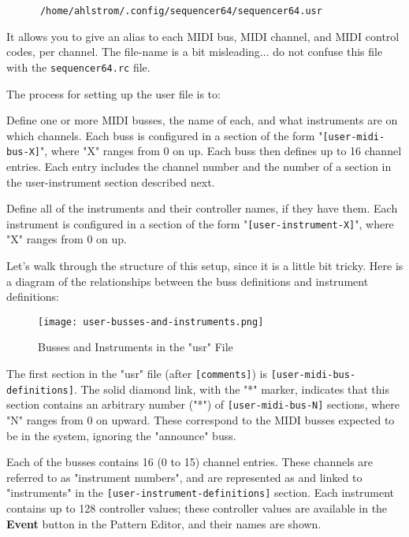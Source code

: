    \begin{verbatim}
      /home/ahlstrom/.config/sequencer64/sequencer64.usr
   \end{verbatim}

   It allows you to give an alias to 
   each MIDI bus, MIDI channel, and MIDI control 
   codes, per channel.
   The file-name is a bit misleading... do not confuse this file with the
   \texttt{sequencer64.rc} file.

   The process for setting up the user file is to:

   \begin{enumber}
      \item Define one or more MIDI busses, the name of each, and what
         instruments are on which channels.  Each buss is configured in a
         section of the form "\texttt{[user-midi-bus-X]}", where "X" ranges
         from 0 on up.  Each buss then defines up to 16 channel entries.
         Each entry includes the channel number and the number of a
         section in the user-instrument section described next.
      \item Define all of the instruments and their controller
         names, if they have them.  Each instrument is configured in a
         section of the form "\texttt{[user-instrument-X]}", where "X"
         ranges from 0 on up.
   \end{enumber}

   Let's walk through the structure of this setup, since it is a little bit
   tricky.  Here is a diagram of the relationships between the buss definitions
   and instrument definitions:

\begin{figure}[H]
   \centering 
   \texttt{[image: user-busses-and-instruments.png]}
   \caption{Busses and Instruments in the "usr" File}
   \label{fig:seq64_manual_user_busses_and_instruments}
\end{figure}

   The first section in the "usr" file (after \texttt{[comments]})
   is \texttt{[user-midi-bus-definitions]}.  The solid diamond link, with the
   "*" marker, indicates that this section contains an arbitrary number ("*")
   of \texttt{[user-midi-bus-N]} sections, where "N" ranges from 0 on upward.
   These correspond to the MIDI busses expected to be in the system, ignoring
   the "announce" buss.

   Each of the busses contains 16 (0 to 15) channel entries.
   These channels are referred to as "instrument numbers", and are
   represented as and linked to "instruments" in the
   \texttt{[user-instrument-definitions]} section.  Each instrument contains up
   to 128 controller values; these controller values are available in the
   \textbf{Event} button in the Pattern Editor, and their names are shown.

